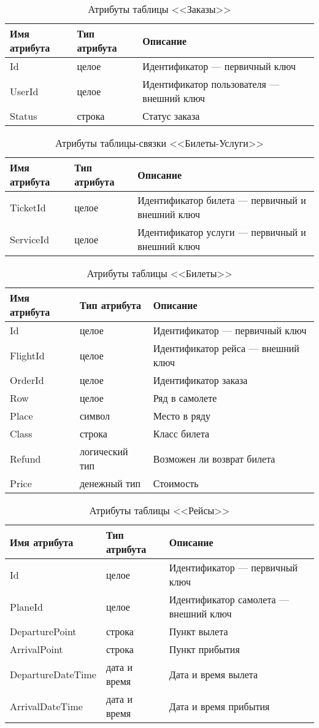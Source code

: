 \documentclass{bmstu}
\begin{document}
\begin{table}[H]
\caption{Атрибуты таблицы <<Заказы>>}
\label{tabular:orders}
\begin{tabular}{|>{\raggedleft}p{4cm}|>{\raggedleft}p{3cm}|>{\raggedleft}p{8cm}|}
\hline
\textbf{Имя атрибута} & \textbf{Тип атрибута} & \textbf{Описание}
\tabularnewline
\hline
Id & целое & Идентификатор --- первичный ключ
\tabularnewline
\hline
UserId & целое & Идентификатор пользователя --- внешний ключ
\tabularnewline
\hline
Status & строка & Статус заказа
\tabularnewline
\hline
\end{tabular}
\end{table}

\begin{table}[H]
\caption{Атрибуты таблицы-связки <<Билеты-Услуги>>}
\label{tabular:tickets_services}
\begin{tabular}{|>{\raggedleft}p{4cm}|>{\raggedleft}p{3cm}|>{\raggedleft}p{8cm}|}
\hline
\textbf{Имя атрибута} & \textbf{Тип атрибута} & \textbf{Описание}
\tabularnewline
\hline
TicketId & целое & Идентификатор билета --- первичный и внешний ключ
\tabularnewline
\hline
ServiceId & целое & Идентификатор услуги --- первичный и внешний ключ
\tabularnewline
\hline
\end{tabular}
\end{table}

\begin{table}[H]
\caption{Атрибуты таблицы <<Билеты>>}
\label{tabular:tickets}
\begin{tabular}{|>{\raggedleft}p{4cm}|>{\raggedleft}p{3cm}|>{\raggedleft}p{8cm}|}
\hline
\textbf{Имя атрибута} & \textbf{Тип атрибута} & \textbf{Описание}
\tabularnewline
\hline
Id & целое & Идентификатор --- первичный ключ
\tabularnewline
\hline
FlightId & целое & Идентификатор рейса --- внешний ключ
\tabularnewline
\hline
OrderId & целое & Идентификатор заказа
\tabularnewline
\hline
Row & целое & Ряд в самолете
\tabularnewline
\hline
Place & символ & Место в ряду
\tabularnewline
\hline
Class & строка & Класс билета
\tabularnewline
\hline
Refund & логический тип & Возможен ли возврат билета
\tabularnewline
\hline
Price & денежный тип & Стоимость
\tabularnewline
\hline
\end{tabular}
\end{table}

\begin{table}[H]
\caption{Атрибуты таблицы <<Рейсы>>}
\label{tabular:flights}
\begin{tabular}{|>{\raggedleft}p{4cm}|>{\raggedleft}p{3cm}|>{\raggedleft}p{8cm}|}
\hline
\textbf{Имя атрибута} & \textbf{Тип атрибута} & \textbf{Описание}
\tabularnewline
\hline
Id & целое & Идентификатор --- первичный ключ
\tabularnewline
\hline
PlaneId & целое & Идентификатор самолета --- внешний ключ
\tabularnewline
\hline
DeparturePoint & строка & Пункт вылета
\tabularnewline
\hline
ArrivalPoint & строка & Пункт прибытия
\tabularnewline
\hline
DepartureDateTime & дата и время & Дата и время вылета
\tabularnewline
\hline
ArrivalDateTime & дата и время & Дата и время прибытия
\tabularnewline
\hline
\end{tabular}
\end{table}
\end{document}
